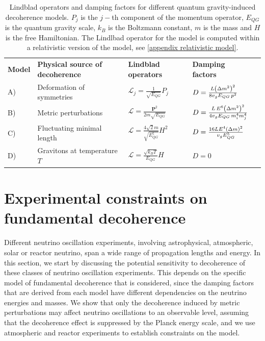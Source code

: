 \documentclass[11pt]{article}
\begin{document}
\begin{table}
    \centering
{\tabulinesep=1.2mm
        \begin{tabu}{|l|l|l|l|l}
       \small\bf{Model}&{\small\bf{Physical source of decoherence}} &{\small\bf{Lindblad operators}}& {\small\bf{Damping factors}}& \\ A)&
       {\footnotesize Deformation of symmetries \cite{Arzano:2022nlo}}  & $\mathcal{L}_j = \frac{1}{\sqrt{E_{QG}}}P_j$ &  $D = \frac{L\qty(\Delta m^2)^2}{8v_{g}E_{QG}\,p^2}$&\\ 
       B)&{\footnotesize  Metric perturbations  \cite{Breuer:2008rh} } & $\mathcal{L} = \frac{\pmb{P}^2}{2m\sqrt{E_{QG}}}$ & $D = \frac{L\,E^6 \qty(\Delta m^2)^2}{4v_{g}E_{QG}\,m_i^4m_j^4}$&\\ 
        C)&{\footnotesize Fluctuating minimal length \cite{Petruzziello:2020wkd}} & $\mathcal{L} = \frac{4\sqrt{2}m}{\sqrt{E_{QG}^5}}H^2$ & $D = \frac{16LE^4\qty(\Delta m)^2}{v_{g}E_{QG}^5}$ &\\ 
        D)&{\footnotesize Gravitons at temperature $T$ \cite{Blencowe:2012mp}} &$\mathcal{L} = \frac{\sqrt{k_B T}}{E_{QG}}H$ &  $D=0$&\\  
        \end{tabu}}
    \caption{Lindblad operators and damping factors for different quantum gravity-induced decoherence models. $P_j$ is the $j-$th component of the momentum operator, $E_{QG}$ is the quantum gravity scale, $k_B$ is the Boltzmann constant, $m$ is the mass and $H$ is the free Hamiltonian. The Lindlbad operator for the model \cite{Breuer:2008rh} is computed within a relativistic version of the model, see \cref{appendix relativistic model}.} 
    \label{table models}
\end{table}





\section{Experimental constraints on fundamental decoherence}\label{sec:experiments}

Different neutrino oscillation experiments, involving astrophysical, atmospheric, solar or reactor neutrino, span a wide range of propagation lengths and energy. 
In this section, we start by discussing the potential sensitivity to decoherence of these classes of neutrino oscillation experiments. This depends on the specific model of fundamental decoherence that is considered, since the damping factors that are derived from each model have different dependencies on the neutrino energies and masses.
We show that only the decoherence induced by metric perturbations \cite{Breuer:2008rh} may affect neutrino oscillations to an observable level, assuming that the decoherence effect is suppressed by the Planck energy scale, and we use atmospheric and reactor experiments to establish constraints on the model.
\end{document}
